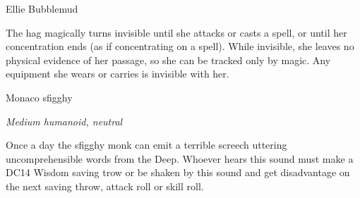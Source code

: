 \documentclass[10pt,twoside, twocolumn, openany]{dndbook}
\begin{document}
\begin{monsterbox}{Ellie Bubblemud}
  \begin{monsteraction}
    The hag magically turns invisible until she
    attacks or casts a spell, or until her concentration ends (as
    if concentrating on a spell). While invisible, she leaves no
    physical evidence of her passage, so she can be tracked only by
    magic. Any equipment she wears or carries is invisible with her.  
  \end{monsteraction}

\end{monsterbox}


\begin{monsterbox}{Monaco sfigghy}
  \begin{hangingpar}
    \textit{Medium humanoid, neutral}
  \end{hangingpar}
  \dndline%
  \basics[%
  armorclass = 12 (natural),
  hitpoints  = \dice{3d8 + 3},
  speed      = {30 ft.},
  ]
  \dndline%
  \stats[
    STR = \stat{16}, %
    DEX = \stat{8},
    CON = \stat{16},
    INT = \stat{7},
    WIS = \stat{11},
    CHA = \stat{8},
  ]
  \dndline%
  \details[%
    savingthrows = {Con +5},
    languages = {Common, Deep speech},
    challenge = {1/2},
  ]
  \dndline%

  \begin{monsteraction}
    Once a day the sfigghy monk can emit a terrible screech uttering uncomprehensible words from the Deep.
    Whoever hears this sound must make a DC14 Wisdom saving trow or be shaken by this sound and get disadvantage on the next saving throw, attack roll or skill roll.
  \end{monsteraction}

  \monstermelee[
    name=Claws,
    mod=+5,
    reach=5,
    targets=one target,
    dmg=\dice{1d4+5},
    dmgtype=slashing,
  ]
 
\end{monsterbox}
\end{document}

